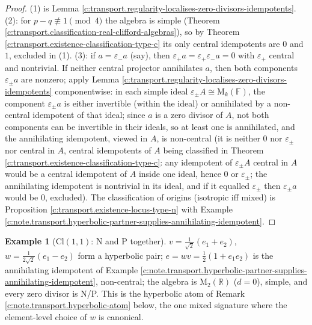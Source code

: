 \documentclass[11pt]{article}
\theoremstyle{definition}
\newtheorem{example}[theorem]{Example}
\theoremstyle{plain}
\providecommand{\Cl}{}\renewcommand{\Cl}{\mathrm{Cl}}
\providecommand{\Mat}{}\renewcommand{\Mat}{\mathrm{M}}
\providecommand{\R}{}\renewcommand{\R}{\mathbb{R}}
\begin{document}
\begin{proof}
(1) is Lemma \ref{c:transport.regularity-localises-zero-divisors-idempotents}. (2): for $p - q \not\equiv 1 \pmod 4$ the algebra is simple (Theorem \ref{c:transport.classification-real-clifford-algebras}), so by Theorem \ref{c:transport.existence-classification-type-c} its only central idempotents are $0$ and $1$, excluded in (1). (3): if $a = \varepsilon_- a$ (say), then $\varepsilon_+ a = \varepsilon_+ \varepsilon_- a = 0$ with $\varepsilon_+$ central and nontrivial. If neither central projector annihilates $a$, then both components $\varepsilon_\pm a$ are nonzero; apply Lemma \ref{c:transport.regularity-localises-zero-divisors-idempotents} componentwise: in each simple ideal $\varepsilon_\pm A \cong \Mat_k(\mathbb{F})$, the component $\varepsilon_\pm a$ is either invertible (within the ideal) or annihilated by a non-central idempotent of that ideal; since $a$ is a zero divisor of $A$, not both components can be invertible in their ideals, so at least one is annihilated, and the annihilating idempotent, viewed in $A$, is non-central (it is neither $0$ nor $\varepsilon_\pm$ nor central in $A$, central idempotents of $A$ being classified in Theorem \ref{c:transport.existence-classification-type-c}: any idempotent of $\varepsilon_\pm A$ central in $A$ would be a central idempotent of $A$ inside one ideal, hence $0$ or $\varepsilon_\pm$; the annihilating idempotent is nontrivial in its ideal, and if it equalled $\varepsilon_\pm$ then $\varepsilon_\pm a$ would be $0$, excluded). The classification of origins (isotropic iff mixed) is Proposition \ref{c:transport.existence-locus-type-n} with Example \ref{c:note.transport.hyperbolic-partner-supplies-annihilating-idempotent}.

\end{proof}

\begin{example}[$\Cl(1,1)$: N and P together]\label{c:note.transport.cl-1-1-n-p-together}
$v = \tfrac{1}{\sqrt2}(e_1 + e_2)$, $w = \tfrac{1}{2\sqrt2}(e_1 - e_2)$ form a hyperbolic pair; $e = wv = \tfrac12(1 + e_1e_2)$ is the annihilating idempotent of Example \ref{c:note.transport.hyperbolic-partner-supplies-annihilating-idempotent}, non-central; the algebra is $\Mat_2(\R)$ ($d = 0$), simple, and every zero divisor is N/P. This is the hyperbolic atom of Remark \ref{c:note.transport.hyperbolic-atom} below, the one mixed signature where the element-level choice of $w$ is canonical.
\end{example}
\end{document}
